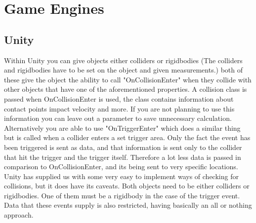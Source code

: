 \documentclass{scrartcl}
\begin{document}
	
	\section{Game Engines}
	\subsection{Unity}
	Within Unity you can give objects either colliders or rigidbodies (The colliders and rigidbodies have to be set on the object and given measurements.) both of these give the object the ability to call "OnCollisionEnter" when they collide with other objects that have one of the aforementioned properties. A collision class is passed when OnCollisionEnter is used, the class contains information about contact points impact velocity and more. If you are not planning to use this information you can leave out a parameter to save unnecessary calculation\cite{UnityCollision}. Alternatively you are able to use "OnTriggerEnter" which does a similar thing but is called when a collider enters a set trigger area. Only the fact the event has been triggered is sent as data, and that information is sent only to the collider that hit the trigger and the trigger itself\cite{UnityTrigger}. Therefore a lot less data is passed in comparison to OnCollisionEnter, and its being sent to very specific locations. Unity has supplied us with some very easy to implement ways of checking for collisions, but it does have its caveats. Both objects need to be either colliders or rigidbodies. One of them must be a rigidbody in the case of the trigger event. Data that these events supply is also restricted, having basically an all or nothing approach.
	
\end{document}
